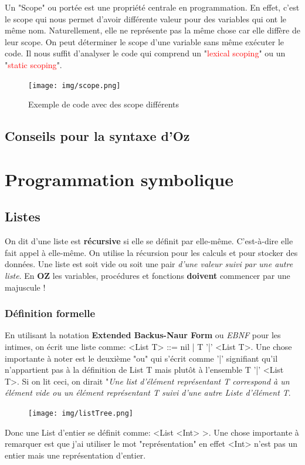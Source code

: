 \documentclass{report}
\begin{document}
Un "Scope" ou portée est une propriété centrale en programmation. En effet, c'est le scope qui nous permet d'avoir différente valeur pour des variables qui ont le même nom. Naturellement, elle ne représente pas la même chose car elle diffère de leur scope. On peut déterminer le scope d'une variable sans même exécuter le code. Il nous suffit d'analyser le code qui comprend un "\textcolor{red}{lexical scoping}" ou un "\textcolor{red}{static scoping}".
\begin{figure}[H]
\centering
\texttt{[image: img/scope.png]}
\caption{Exemple de code avec des scope différents}
\end{figure}
\section{Conseils pour la syntaxe d'Oz}

\chapter{Programmation symbolique}
\section{Listes}
On dit d'une liste est \textbf{récursive} si elle se définit par elle-même. C'est-à-dire elle fait appel à elle-même. On utilise la récursion pour les calculs et pour stocker des données.
Une liste est soit vide ou soit une pair \textit{d'une valeur suivi par une autre liste}. En \textbf{OZ} les variables, procédures et fonctions \textbf{doivent} commencer par une majuscule !
\subsection{Définition formelle}
En utilisant la notation \textbf{Extended Backus-Naur Form} ou \textit{EBNF} pour les intimes, on écrit une liste comme: <List T> ::= nil | T '|' <List T>. Une chose importante à noter est le deuxième "ou" qui s'écrit comme '|' signifiant qu'il n'appartient pas à la définition de List T mais plutôt à l'ensemble T '|' <List T>. Si on lit ceci, on dirait "\textit{Une list d'élément représentant T correspond à un élément vide ou un élément représentant T suivi d'une autre Liste d'élément T}.\\

\begin{figure}
	\centering
	\texttt{[image: img/listTree.png]}
\end{figure}
Donc une List d'entier se définit comme: <List <Int>
>. Une chose importante à remarquer est que j'ai utiliser le mot "représentation" en effet <Int> n'est pas un entier mais une représentation d'entier.\\
\end{document}
